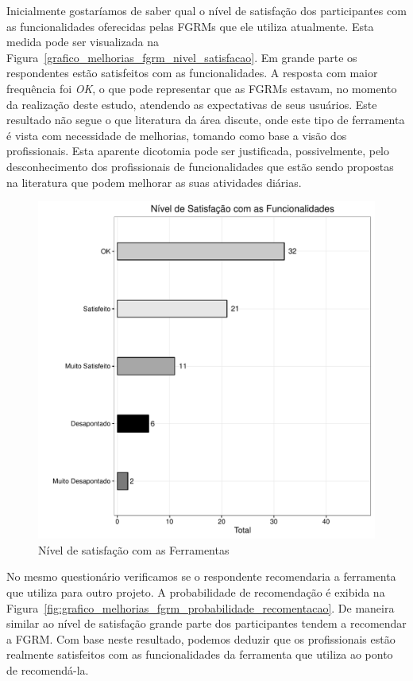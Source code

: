 Inicialmente gostaríamos de saber qual o nível de satisfação dos participantes
com as funcionalidades oferecidas pelas FGRMs que ele utiliza atualmente.
Esta medida pode ser visualizada na
Figura~\ref{grafico_melhorias_fgrm_nivel_satisfacao}. Em grande parte os
respondentes estão satisfeitos com as funcionalidades. A resposta com maior
frequência foi \textit{OK}, o que pode representar que as FGRMs estavam, no
momento da realização deste estudo, atendendo as expectativas de seus usuários.
Este resultado não segue o que literatura da área discute, onde este tipo de
ferramenta é vista com necessidade de melhorias, tomando como base a visão dos
profissionais. Esta aparente dicotomia pode ser justificada, possivelmente, pelo
desconhecimento dos profissionais de funcionalidades que estão sendo propostas
na literatura que podem melhorar as suas atividades diárias.

\begin{figure}[htpb]
	\centering
	\includegraphics[width=0.8\linewidth]{./chapter-pesquisa-com-profissionais/img/grafico_melhorias_fgrm_nivel_satisfacao.pdf}
	\caption{Nível de satisfação com as Ferramentas}
\label{fig:grafico_melhorias_fgrm_nivel_satisfacao}
\end{figure}

No mesmo questionário verificamos se o respondente recomendaria a ferramenta que
utiliza para outro projeto. A probabilidade de recomendação é exibida na
Figura~\ref{fig:grafico_melhorias_fgrm_probabilidade_recomentacao}. De maneira
similar ao nível de satisfação grande parte dos participantes tendem a
recomendar a FGRM\@. Com base neste resultado, podemos deduzir que os
profissionais estão realmente satisfeitos com as funcionalidades da ferramenta
que utiliza ao ponto de recomendá-la.

